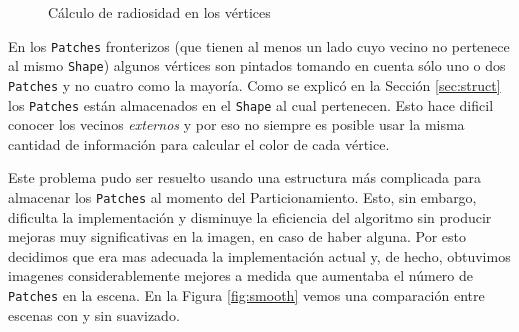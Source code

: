 \documentclass[letterpaper]{article}
\begin{document}
\begin{figure}[htbp]
  \centering
  
  \caption{Cálculo de radiosidad en los vértices}
  \label{fig:vertex}
\end{figure}

En los \texttt{Patches} fronterizos (que tienen al menos un lado cuyo
vecino no pertenece al mismo \texttt{Shape}) algunos vértices son
pintados tomando en cuenta sólo uno o dos \texttt{Patches} y no cuatro
como la mayoría. Como se explicó en la Sección \ref{sec:struct} los
\texttt{Patches} están almacenados en el \texttt{Shape} al cual
pertenecen. Esto hace dificil conocer los vecinos \textsl{externos} y
por eso no siempre es posible usar la misma cantidad de información
para calcular el color de cada vértice.

Este problema pudo ser resuelto usando una estructura más complicada
para almacenar los \texttt{Patches} al momento del
Particionamiento. Esto, sin embargo, dificulta la implementación y
disminuye la eficiencia del algoritmo sin producir mejoras muy
significativas en la imagen, en caso de haber alguna. Por esto
decidimos que era mas adecuada la implementación actual y, de hecho,
obtuvimos imagenes considerablemente mejores a medida que aumentaba el
número de \texttt{Patches} en la escena. En la Figura \ref{fig:smooth}
vemos una comparación entre escenas con y sin suavizado. 
\end{document}
